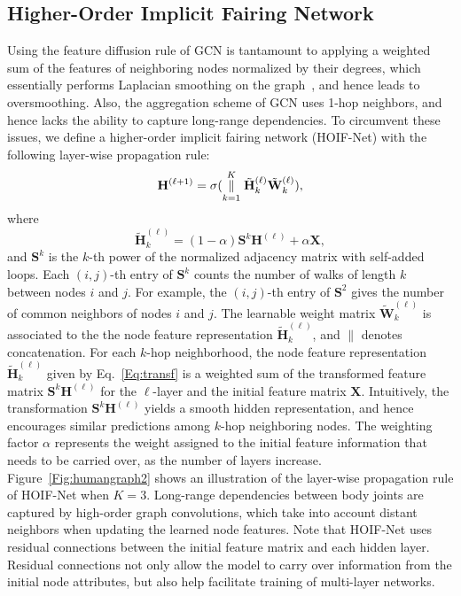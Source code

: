 \documentclass{bmvc2k}
\begin{document}
\subsection{Higher-Order Implicit Fairing Network}
Using the feature diffusion rule of GCN is tantamount to applying a weighted sum of the features of neighboring nodes normalized by their degrees, which essentially performs Laplacian smoothing on the graph~\cite{Li:18}, and hence leads to oversmoothing. Also, the aggregation scheme of GCN uses 1-hop neighbors, and hence lacks the ability to capture long-range dependencies. To circumvent these issues, we define a higher-order implicit fairing network (HOIF-Net) with the following layer-wise propagation rule:
\begin{equation}
\mathbf{H}^{(\ell+1)}=\sigma(\overset{K}{\underset{k=1}{\parallel}}\tilde{\mathbf{H}}_{k}^{(\ell)}\tilde{\mathbf{W}}_{k}^{(\ell)}),
\label{Eq:IFNet}
\end{equation}
where
\begin{equation}
\tilde{\bm{H}}_{k}^{(\ell)}= (1-\alpha)\bm{S}^{k}\bm{H}^{(\ell)}+\alpha\bm{X},
\label{Eq:transf}
\end{equation}
and $\bm{S}^{k}$ is the $k$-th power of the normalized adjacency matrix with self-added loops. Each $(i,j)$-th entry of $\bm{S}^{k}$ counts the number of walks of length $k$ between nodes $i$ and $j$. For example, the $(i,j)$-th entry of $\bm{S}^{2}$ gives the number of common neighbors of nodes $i$ and $j$. The learnable weight matrix $\tilde{\bm{W}}_{k}^{(\ell)}$ is associated to the the node feature representation $\tilde{\bm{H}}_{k}^{(\ell)}$, and $\parallel$ denotes concatenation. For each $k$-hop neighborhood, the node feature representation $\tilde{\bm{H}}_{k}^{(\ell)}$ given by Eq.~\eqref{Eq:transf} is a weighted sum of the transformed feature matrix $\bm{S}^{k}\bm{H}^{(\ell)}$ for the $\ell$-layer and the initial feature matrix $\bm{X}$. Intuitively, the transformation $\bm{S}^{k}\bm{H}^{(\ell)}$ yields a smooth hidden representation, and hence encourages similar predictions among $k$-hop neighboring nodes. The weighting factor $\alpha$ represents the weight assigned to the initial feature information that needs to be carried over, as the number of layers increase. Figure~\ref{Fig:humangraph2} shows an illustration of the layer-wise propagation rule of HOIF-Net when $K=3$. Long-range dependencies between body joints are captured by high-order graph convolutions, which take into account distant neighbors when updating the learned node features. Note that HOIF-Net uses residual connections between the initial feature matrix and each hidden layer. Residual connections not only allow the model to carry over information from the initial node attributes, but also help facilitate training of multi-layer networks.
\end{document}

